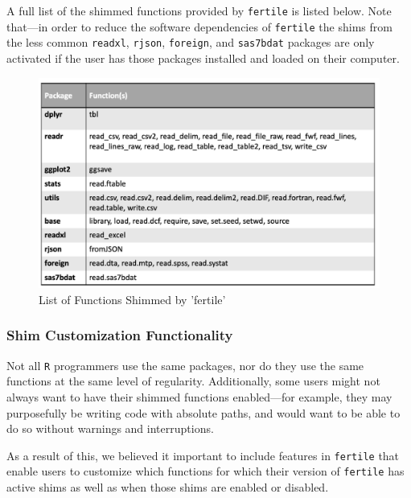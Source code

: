 \documentclass[12pt,twoside]{reedthesis}
\begin{document}
A full list of the shimmed functions provided by \texttt{fertile} is listed below. Note that---in order to reduce the software dependencies of \texttt{fertile} the shims from the less common \texttt{readxl}, \texttt{rjson}, \texttt{foreign}, and \texttt{sas7bdat} packages are only activated if the user has those packages installed and loaded on their computer.
\begin{figure}
\includegraphics[width=1\linewidth]{figure/shims-list} \caption{List of Functions Shimmed by 'fertile'}\label{fig:unnamed-chunk-58}
\end{figure}
\hypertarget{shim-customization-functionality}{%
\subsubsection{Shim Customization Functionality}\label{shim-customization-functionality}}

Not all \texttt{R} programmers use the same packages, nor do they use the same functions at the same level of regularity. Additionally, some users might not always want to have their shimmed functions enabled---for example, they may purposefully be writing code with absolute paths, and would want to be able to do so without warnings and interruptions.

As a result of this, we believed it important to include features in \texttt{fertile} that enable users to customize which functions for which their version of \texttt{fertile} has active shims as well as when those shims are enabled or disabled.
\end{document}
